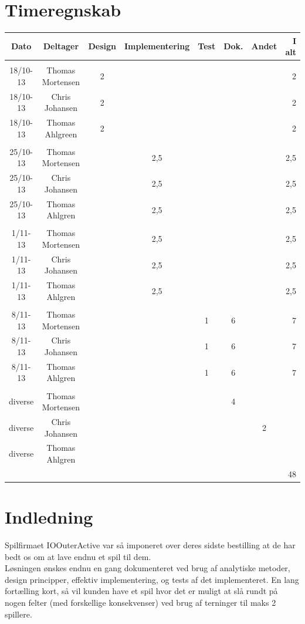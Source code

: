 \documentclass{article}
\begin{document}
\section*{Timeregnskab}
\begin{tabular}{|c|c|c|c|c|c|c|r|} \hline
 Dato & Deltager & Design & Implementering & Test & Dok. & Andet & I alt \\ \hline
&&&&&&& \\ \hline
 18/10-13 & Thomas Mortensen & 2& & & & & 2\\ \hline
 18/10-13 & Chris Johansen & 2& & & & &2 \\ \hline
 18/10-13 & Thomas Ahlgreen & 2& & & & & 2\\ \hline
 &&&&&&& \\ \hline
 25/10-13 & Thomas Mortensen & & 2,5& & & &2,5 \\ \hline
 25/10-13 & Chris Johansen & &2,5 & & & &2,5 \\ \hline
 25/10-13 & Thomas Ahlgren & & 2,5& & & &2,5 \\ \hline
 &&&&&&& \\ \hline
 1/11-13 & Thomas Mortensen & &2,5 & & & &2,5 \\ \hline
 1/11-13 & Chris Johansen & &2,5 & & & & 2,5 \\ \hline
 1/11-13 & Thomas Ahlgren & &2,5 & & & & 2,5 \\ \hline
 &&&&&&& \\ \hline
 8/11-13 & Thomas Mortensen & & &1 &6 & &7 \\ \hline
 8/11-13 & Chris Johansen & & &1 &6 & &7 \\ \hline
 8/11-13 & Thomas Ahlgren & & &1 &6 & &7 \\ \hline
 &&&&&&& \\ \hline
 diverse & Thomas Mortensen & & & &4 & & \\ \hline
 diverse & Chris Johansen & & & & &2 & \\ \hline
 diverse & Thomas Ahlgren & & & & & & \\ \hline
 &&&&&&& 48\\ \hline
\end{tabular}
\newpage
\tableofcontents
\newpage
\section{Indledning}
Spilfirmaet IOOuterActive var så imponeret over deres sidste bestilling at
de har bedt os om at lave endnu et spil til dem.
\\
Løsningen ønskes endnu en gang dokumenteret ved brug af analytiske metoder,
design principper, effektiv implementering, og tests af det implementeret.
En lang fortælling kort, så vil kunden have et spil hvor det er muligt at slå
rundt på nogen felter (med forskellige konsekvenser) ved brug af terninger
til maks 2 spillere.
\\
\end{document}
